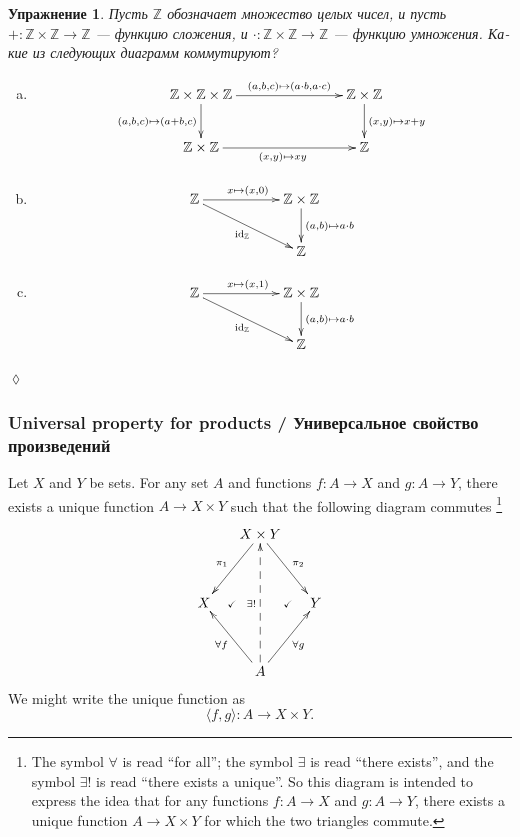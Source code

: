 \documentclass[a4paper]{book}
\def\tn{\textnormal}
\def\ZZ{{\mathbb Z}}
\def\hsp{\hspace{.3in}}
\def\to{\rightarrow}
\def\taking{\colon}
\def\la{\langle}
\def\ra{\rangle}
\newcommand{\prodmap}[2]{\la#1,#2\ra}
\def\id{\tn{id}}
\theoremstyle{myth}
\newtheorem{lemmaENG}[envENG]{\begin{english}Lemma\end{english}}
\newtheorem{excRUS}[envRUS]{Упражнение}
\newenvironment{exerciseRUS}{\begin{excRUS}}{\hspace*{\fill}$\lozenge$\end{excRUS}}
\def\sexc{\begin{enumerate}[a.)]\setlength{\itemsep}{.1cm}\setlength{\parskip}{.1cm}\item}
\def\next{\item}
\def\endsexc{\end{enumerate}}
\begin{document}
\begin{russian}
\begin{exerciseRUS}
Пусть $\ZZ$ обозначает множество целых чисел, и пусть $+\taking\ZZ\times\ZZ\to\ZZ$ — функцию сложения, и $\cdot\taking\ZZ\times\ZZ\to\ZZ$ — функцию умножения. Какие из следующих диаграмм коммутируют?
\sexc $$\xymatrix{
\ZZ\times\ZZ\times\ZZ\ar[rr]^-{(a,b,c)\mapsto(a\cdot b,a\cdot c)}\ar[d]_{(a,b,c)\mapsto(a+b,c)}&\hsp&\ZZ\times\ZZ\ar[d]^{(x,y)\mapsto x+y}\\
\ZZ\times\ZZ\ar[rr]_{(x,y)\mapsto xy}&&\ZZ}
$$
\next $$
\xymatrix{
\ZZ\ar[rr]^{x\mapsto (x,0)}\ar[drr]_{\id_\ZZ}&&\ZZ\times\ZZ\ar[d]^{(a,b)\mapsto a\cdot b}\\&&\ZZ}
$$
\next$$
\xymatrix{
\ZZ\ar[rr]^{x\mapsto (x,1)}\ar[drr]_{\id_\ZZ}&&\ZZ\times\ZZ\ar[d]^{(a,b)\mapsto a\cdot b}\\&&\ZZ}
$$
\endsexc
\end{exerciseRUS}


\subsubsection{Universal property for products / Универсальное свойство произведений}

\begin{lemmaENG}\label{lemma:up for prod}
Let $X$ and $Y$ be sets. For any set $A$ and functions $f\taking A\to X$ and $g\taking A\to Y$, there exists a unique function $A\to X\times Y$ such that the following diagram commutes%
\footnote{The symbol $\forall$ is read “for all”; the symbol $\exists$ is read “there exists”, and the symbol $\exists!$ is read “there exists a unique”. So this diagram is intended to express the idea that for any functions $f\taking A\to X$ and $g\taking A\to Y$, there exists a unique function $A\to X\times Y$ for which the two triangles commute.}
\begin{align}\label{dia:univ prop for products}
\xymatrix@=15pt{&X\times Y\ar[ldd]_{\pi_1}\ar[rdd]^{\pi_2}\\\\X\ar@{}[r]|{\checkmark}&&Y\ar@{}[l]|{\checkmark}\\\\&A\ar[luu]^{\forall f}\ar[ruu]_{\forall g}\ar@{-->}[uuuu]^{\exists !}}
\end{align}
We might write the unique function as $$\prodmap{f}{g}\taking A\to X\times Y.$$
\end{lemmaENG}


\end{russian}
\end{document}
